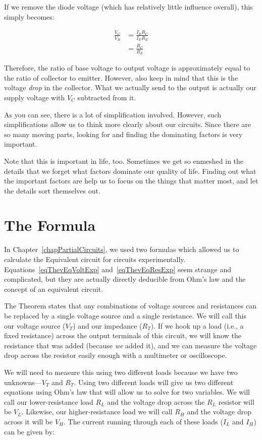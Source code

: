 If we remove the diode voltage (which has relatively little influence overall), this simply becomes:

\begin{align*}
\frac{V_C}{V_B} &= \frac{I_E R_C}{I_E R_E} \\
 &= \frac{R_C}{R_E}
\end{align*}

Therefore, the ratio of base voltage to output voltage is approximately equal to the ratio of collector to emitter.
However, also keep in mind that this is the voltage \emph{drop} in the collector.  
What we actually send to the output is actually our supply voltage with $V_C$ subtracted from it.

As you can see, there is a lot of simplification involved.
However, such simplifications allow us to think more clearly about our circuits.
Since there are so many moving parts, looking for and finding the dominating factors is very important.

Note that this is important in life, too.
Sometimes we get so enmeshed in the details that we forget what factors dominate our quality of life.
Finding out what the important factors are help us to focus on the things that matter most, and let the details sort themselves out.

\section{The \thev Formula}

In Chapter~\ref{chapPartialCircuits}, we used two formulas which allowed us to calculate the \thev Equivalent circuit for circuits experimentally.
Equations~\ref{eqThevEqVoltExp} and~\ref{eqThevEqResExp} seem strange and complicated, but they are actually directly deducible from Ohm's law and the concept of an equivalent circuit.

The \thev Theorem states that any combinations of voltage sources and resistances can be replaced by a single voltage source and a single resistance.  
We will call this our \thev voltage source ($V_T$) and our \thev impedance ($R_T$).
If we hook up a load (i.e., a fixed resistance) across the output terminals of this circuit, we will know the resistance that was added (because \emph{we} added it), and we can measure the voltage drop across the resistor easily enough with a multimeter or oscilloscope.

We will need to measure this using two different loads because we have two unknowns---$V_T$ and $R_T$.
Using two different loads will give us two different equations using Ohm's law that will allow us to solve for two variables.
We will call our lower-resistance load $R_L$ and the voltage drop across the $R_L$ resistor will be $V_L$.
Likewise, our higher-resistance load we will call $R_H$ and the voltage drop across it will be $V_H$.
The current running through each of these loads ($I_L$ and $I_H$) can be given by:


